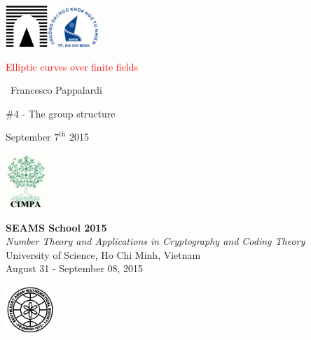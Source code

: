 \documentclass[10pt,handout]{beamer} %
\title[Elliptic curves over $\F_{q}$]{\insertlecture}
\theoremstyle{definition}
\begin{document}
\begin{frame}
\includegraphics[width=1.6cm]{images/roma3.pdf}\hfill\includegraphics[width=1.9cm]{images/HCMCUS.jpeg}
\vfill

\begin{center}\begin{sc}
\begin{Large}

\textcolor{red}{Elliptic curves over finite fields}
\end{Large}\bigskip

\ {Francesco Pappalardi}\bigskip\bigskip

\begin{large}\begin{bf}\#4 - The group structure
\end{bf}\end{large}\medskip

September $7^{\text{th}}$ 2015\medskip
\vfill
\end{sc}\end{center}

\includegraphics[width=1.6cm]{images/cimpalogo.pdf}\hfill
\begin{minipage}[b]{9.3cm}
\textbf{SEAMS School 2015}\\
\textit{Number Theory and Applications in Cryptography and Coding Theory}\\
University of Science, Ho Chi Minh, Vietnam\\
August 31 - September 08, 2015
\end{minipage}\hfill
\includegraphics[width=1.9cm]{images/seams.png}
\end{frame}
\end{document}
